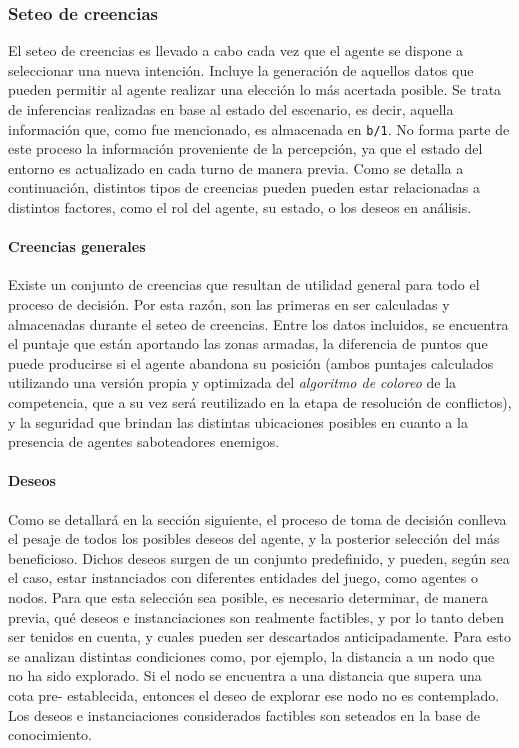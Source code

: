 \subsubsection{Seteo de creencias}
 \label{subsub:seteo_de_creencias}
  
 El seteo de creencias es llevado a cabo cada vez que el agente se
 dispone a seleccionar una nueva intención.
 Incluye la generación de aquellos datos que pueden permitir al agente
 realizar una elección lo más acertada posible.
 Se trata de inferencias realizadas en base al estado del escenario, es
 decir, aquella información que, como fue mencionado, es almacenada en
 \texttt{b/1}.
 No forma parte de este proceso la información proveniente de la
 percepción, ya que el estado del entorno es actualizado en cada turno
 de manera previa.
 Como se detalla a continuación, distintos tipos de creencias pueden
 pueden estar relacionadas a distintos factores, como el rol del
 agente, su estado, o los deseos en análisis.
  
 \paragraph{Creencias generales}
  
 Existe un conjunto de creencias que resultan de utilidad general para
 todo el proceso de decisión.
 Por esta razón, son las primeras en ser calculadas y almacenadas
 durante el seteo de creencias.
 Entre los datos incluidos, se encuentra el puntaje que están aportando
 las zonas armadas, la diferencia de puntos que puede producirse si el
 agente abandona su posición (ambos puntajes calculados utilizando una
 versión propia y optimizada del \textit{algoritmo de coloreo} de la
 competencia, que a su vez será reutilizado en la etapa de resolución
 de conflictos), y la seguridad que brindan las distintas ubicaciones
 posibles en cuanto a la presencia de agentes saboteadores enemigos.
  
 \paragraph{Deseos}
  
 Como se detallará en la sección siguiente, el proceso de toma de
 decisión conlleva el pesaje de todos los posibles deseos del agente, y
 la posterior selección del más beneficioso.
 Dichos deseos surgen de un conjunto predefinido, y pueden, según sea
 el caso, estar instanciados con diferentes entidades del juego, como
 agentes o nodos. Para que esta selección sea posible, es necesario
 determinar, de manera previa, qué deseos e instanciaciones son
 realmente factibles, y por lo tanto deben ser tenidos en cuenta, y
 cuales pueden ser descartados anticipadamente.
 Para esto se analizan distintas condiciones como, por ejemplo, la
 distancia a un nodo que no ha sido explorado.
 Si el nodo se encuentra a una distancia que supera una cota pre-
 establecida, entonces el deseo de explorar ese nodo no es contemplado.
 Los deseos e instanciaciones considerados factibles son seteados en la
 base de conocimiento.
 

